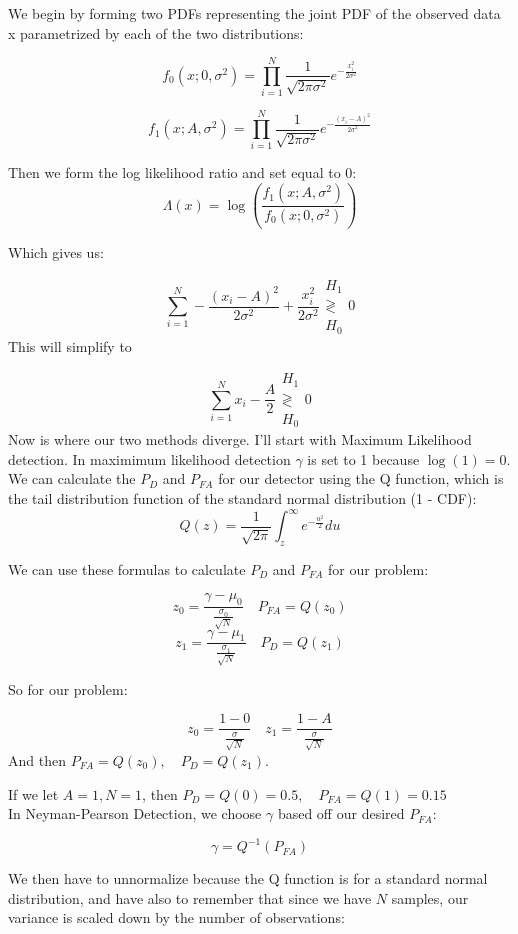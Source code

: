 \documentclass[12pt]{article}
\begin{document}
We begin by forming two PDFs representing the joint PDF of the observed data x parametrized by each of the two distributions:

\[f_0(x; 0, \sigma^2)  = \prod_{i=1}^N \frac{1}{\sqrt{2\pi \sigma^2}}e^{-\frac{x_i^2}{2\sigma^2}}\]

\[f_1(x; A, \sigma^2)  = \prod_{i=1}^N \frac{1}{\sqrt{2\pi \sigma^2}}e^{-\frac{(x_i - A)^2}{2\sigma^2}}\]

Then we form the log likelihood ratio and set equal to 0:
\[\Lambda(x) = \log \left( \frac{f_1(x; A, \sigma^2)}{f_0(x; 0, \sigma^2)}\right)\]

Which gives us: 

\[
\sum_{i=1}^N-\frac{(x_i - A)^2}{2\sigma^2} + \frac{x_i^2}{2\sigma^2} \mathrel{\substack{H_1 \\ \gtrless \\ H_0}} 0
\]
This will simplify to 

\[
\sum_{i=1}^N x_i- \frac{A}{2} \mathrel{\substack{H_1 \\ \gtrless \\ H_0}} 0
\]
Now is where our two methods diverge. I'll start with Maximum Likelihood detection. In maximimum likelihood detection \(\gamma\) is set to 1 because \(\log(1) = 0\). We can calculate the \(P_D\) and \(P_{FA}\) for our detector using the Q function, which is the tail distribution function of the standard normal distribution (1 - CDF): 
\[Q(z) = \frac{1}{\sqrt{2\pi}}\int_z^\infty e^{-\frac{u^2}{2}}du\]

We can use these formulas to calculate  \(P_D\) and \(P_{FA}\) for our problem:

\[z_0 = \frac{\gamma - \mu_0}{\frac{\sigma_0}{\sqrt{N}}} \quad P_{FA} = Q(z_0)\]
\[z_1 = \frac{\gamma - \mu_1}{\frac{\sigma_1}{\sqrt{N}}} \quad P_{D} = Q(z_1)\]

So for our problem:

\[z_0 = \frac{1 - 0}{\frac{\sigma}{\sqrt{N}}} \quad z_1 = \frac{1 - A}{\frac{\sigma}{\sqrt{N}}}\]
And then \(P_{FA} = Q(z_0), \quad P_D = Q(z_1)\).

If we let \(A=1, N=1\), then \(P_D  = Q(0) = 0.5, \quad P_{FA} = Q(1) = 0.15\)\\

In Neyman-Pearson Detection, we choose \(\gamma\) based off our desired \(P_{FA}\):

\[\gamma = Q^{-1}(P_{FA})\]


We then have to unnormalize because the Q function is for a standard normal distribution, and have also to remember that since we have \(N\) samples, our variance is scaled down by the number of observations:
\end{document}
